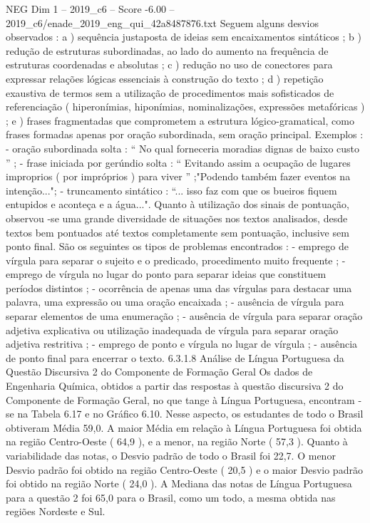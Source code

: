 \begin{textsample}{NEG Dim 1 – 2019\_c6 – Score -6.00 – 2019\_c6/enade\_2019\_eng\_qui\_42a8487876.txt}
Seguem alguns desvios observados : a ) sequência justaposta de ideias sem encaixamentos sintáticos ; b ) redução de estruturas subordinadas, ao lado do aumento na frequência de estruturas coordenadas e absolutas ; c ) redução no uso de conectores para expressar relações lógicas essenciais à construção do texto ; d ) repetição exaustiva de termos sem a utilização de procedimentos mais sofisticados de referenciação ( hiperonímias, hiponímias, nominalizações, expressões metafóricas ) ; e ) frases fragmentadas que comprometem a estrutura lógico-gramatical, como frases formadas apenas por oração subordinada, sem oração principal.
Exemplos : - oração subordinada solta : “ No qual forneceria moradias dignas de baixo custo ” ; - frase iniciada por gerúndio solta : “ Evitando assim a ocupação de lugares improprios ( por impróprios ) para viver ” ;"Podendo também fazer eventos na intenção..."; - truncamento sintático : “... isso faz com que os bueiros fiquem entupidos e aconteça e a água...".
Quanto à utilização dos sinais de pontuação, observou -se uma grande diversidade de situações nos textos analisados, desde textos bem pontuados até textos completamente sem pontuação, inclusive sem ponto final.
São os seguintes os tipos de problemas encontrados : - emprego de vírgula para separar o sujeito e o predicado, procedimento muito frequente ; - emprego de vírgula no lugar do ponto para separar ideias que constituem períodos distintos ; - ocorrência de apenas uma das vírgulas para destacar uma palavra, uma expressão ou uma oração encaixada ; - ausência de vírgula para separar elementos de uma enumeração ; - ausência de vírgula para separar oração adjetiva explicativa ou utilização inadequada de vírgula para separar oração adjetiva restritiva ; - emprego de ponto e vírgula no lugar de vírgula ; - ausência de ponto final para encerrar o texto. 6.3.1.8 Análise de Língua Portuguesa da Questão Discursiva 2 do Componente de Formação Geral Os dados de Engenharia Química, obtidos a partir das respostas à questão discursiva 2 do Componente de Formação Geral, no que tange à Língua Portuguesa, encontram -se na Tabela 6.17 e no Gráfico 6.10.
Nesse aspecto, os estudantes de todo o Brasil obtiveram Média 59,0.
A maior Média em relação à Língua Portuguesa foi obtida na região Centro-Oeste ( 64,9 ), e a menor, na região Norte ( 57,3 ).
Quanto à variabilidade das notas, o Desvio padrão de todo o Brasil foi 22,7.
O menor Desvio padrão foi obtido na região Centro-Oeste ( 20,5 ) e o maior Desvio padrão foi obtido na região Norte ( 24,0 ).
A Mediana das notas de Língua Portuguesa para a questão 2 foi 65,0 para o Brasil, como um todo, a mesma obtida nas regiões Nordeste e Sul.

\end{textsample}
